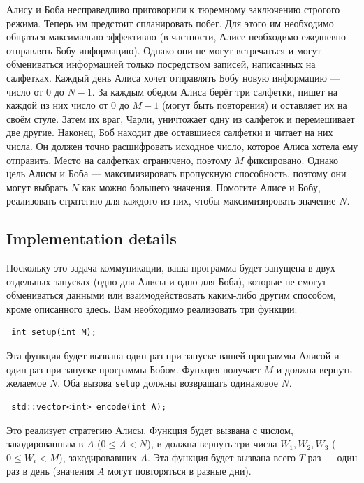 \documentclass[12pt]{article}
\begin{document}
\renewcommand{\round}{Day 1}
\renewcommand{\problemName}{Task Prison}
\renewcommand{\lang}{Russian}

\renewcommand{\tl}{$2$ sec.}
\renewcommand{\ml}{$1024$ MB}
\problem{\problemName}

Алису и Боба несправедливо приговорили к тюремному заключению строгого режима. Теперь им предстоит спланировать побег. Для этого им необходимо общаться максимально эффективно (в частности, Алисе необходимо ежедневно отправлять Бобу информацию). Однако они не могут встречаться и могут обмениваться информацией только посредством записей, написанных на салфетках. Каждый день Алиса хочет отправлять Бобу новую информацию — число от $0$ до $N-1$. За каждым обедом Алиса берёт три салфетки, пишет на каждой из них число от $0$ до $M-1$ (могут быть повторения) и оставляет их на своём стуле. Затем их враг, Чарли, уничтожает одну из салфеток и перемешивает две другие. Наконец, Боб находит две оставшиеся салфетки и читает на них числа. Он должен точно расшифровать исходное число, которое Алиса хотела ему отправить. Место на салфетках ограничено, поэтому $M$ фиксировано. Однако цель Алисы и Боба — максимизировать пропускную способность, поэтому они могут выбрать $N$ как можно большего значения. Помогите Алисе и Бобу, реализовать стратегию для каждого из них, чтобы максимизировать значение $N$.

\subsection{Implementation details}
Поскольку это задача коммуникации, ваша программа будет запущена в двух отдельных запусках (одно для Алисы и одно для Боба), которые не смогут обмениваться данными или взаимодействовать каким-либо другим способом, кроме описанного здесь. Вам необходимо реализовать три функции:

\begin{lstlisting}
 int setup(int M);
\end{lstlisting}

Эта функция будет вызвана один раз при запуске вашей программы Алисой и один раз при запуске программы Бобом. Функция получает $M$ и должна вернуть желаемое $N$. Оба вызова \texttt{setup} должны возвращать одинаковое $N$.

\begin{lstlisting}
 std::vector<int> encode(int A);
\end{lstlisting}

Это реализует стратегию Алисы. Функция будет вызвана с числом, закодированным в $A$ ($0 \leq A < N$), и должна вернуть три числа $W_1, W_2, W_3$ ($0 \leq W_i < M$), закодировавших $A$. Эта функция будет вызвана всего $T$ раз — один раз в день (значения $A$ могут повторяться в разные дни).
\end{document}
